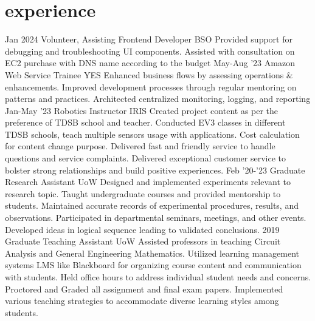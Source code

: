 \documentclass[]{twentysecondcv}
\begin{document}
\section{experience}
\begin{twenty}
  \twentyitem
    {Jan 2024}
    {Volunteer, Assisting Frontend Developer}
    {BSO}
    { Provided support for debugging and troubleshooting UI components. 
      Assisted with consultation on EC2 purchase with DNS name according to the budget }
  \twentyitem
    {May-Aug '23}
    {Amazon Web Service Trainee}
    {YES}
    {Enhanced business flows by assessing operations $\&$ enhancements. 
    Improved development processes through regular mentoring on patterns and practices. 
    Architected centralized monitoring, logging, and reporting}
  \twentyitem
    {Jan-May '23}
    {Robotics Instructor}
    {IRIS}
    {Created project content as per the preference of TDSB school and teacher.
    Conducted EV3 classes in different TDSB schools, teach multiple sensors usage with applications.
    Cost calculation for content change purpose.
    Delivered fast and friendly service to handle questions and service complaints.
    Delivered exceptional customer service to bolster strong relationships and build positive experiences.}
    \twentyitem
    {Feb '20-'23} 
    {Graduate Research Assistant}
    {UoW}
    {Designed and implemented experiments relevant to research topic.
    Taught undergraduate courses and provided mentorship to students.
    Maintained accurate records of experimental procedures, results, and observations.
    Participated in departmental seminars, meetings, and other events.
    Developed ideas in logical sequence leading to validated conclusions.}
    \twentyitem
    {2019}
    {Graduate Teaching Assistant}
    {UoW}
    {Assisted professors in teaching Circuit Analysis and General Engineering Mathematics.
    Utilized learning management systems LMS like Blackboard for organizing course content and communication with students.
    Held office hours to address individual student needs and concerns. Proctored and Graded all assignment and final exam papers.
    Implemented various teaching strategies to accommodate diverse learning styles among students.}

  \end{twenty}
\end{document}
